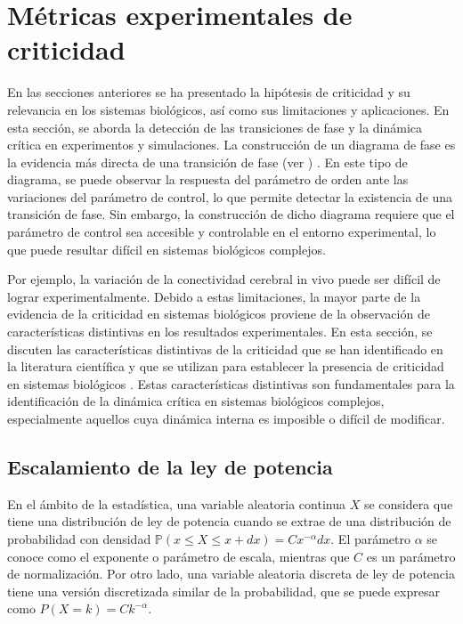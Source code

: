 \section{Métricas experimentales de criticidad}


En las secciones anteriores se ha presentado la hipótesis de criticidad y su relevancia en los sistemas biológicos, así como sus limitaciones y aplicaciones. En esta sección, se aborda la detección de las transiciones de fase y la dinámica crítica en experimentos y simulaciones.
La construcción de un diagrama de fase es la evidencia más directa de una transición de fase (ver  ) \cite{dickman_paths_2000}. En este tipo de diagrama, se puede observar la respuesta del parámetro de orden ante las variaciones del parámetro de control, lo que permite detectar la existencia de una transición de fase. Sin embargo, la construcción de dicho diagrama requiere que el parámetro de control sea accesible y controlable en el entorno experimental, lo que puede resultar difícil en sistemas biológicos complejos.

Por ejemplo, la variación de la conectividad cerebral in vivo puede ser difícil de lograr experimentalmente. Debido a estas limitaciones, la mayor parte de la evidencia de la criticidad en sistemas biológicos proviene de la observación de características distintivas en los resultados experimentales. En esta sección, se discuten las características distintivas de la criticidad que se han identificado en la literatura científica y que se utilizan para establecer la presencia de criticidad en sistemas biológicos \cite{hesse_self-organized_2014}. Estas características distintivas son fundamentales para la identificación de la dinámica crítica en sistemas biológicos complejos, especialmente aquellos cuya dinámica interna es imposible o difícil  de modificar.



\subsection{Escalamiento de la ley de potencia}\label{sec:leypotencia_intro}


En el ámbito de la estadística, una variable aleatoria continua $X$ se considera que tiene una distribución de ley de potencia cuando se extrae de una distribución de probabilidad con densidad $	\mathbb{P}\left(x\leq X\leq x+dx\right)=Cx^{-\alpha}dx$. El parámetro $\alpha$ se conoce como el exponente o parámetro de escala, mientras que $C$ es un parámetro de normalización. Por otro lado, una variable aleatoria discreta de ley de potencia tiene una versión discretizada similar de la probabilidad, que se puede expresar como 	$P(X=k)=Ck^{-\alpha}$.

